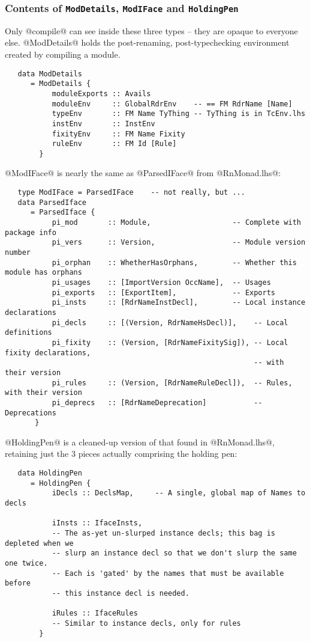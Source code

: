 \documentclass[11pt]{article}
\begin{document}
\subsubsection{Contents of \mbox{\tt ModDetails}, 
               \mbox{\tt ModIFace} and \mbox{\tt HoldingPen}}
Only @compile@ can see inside these three types -- they are opaque to
everyone else.  @ModDetails@ holds the post-renaming,
post-typechecking environment created by compiling a module.

\begin{verbatim}
   data ModDetails
      = ModDetails {
           moduleExports :: Avails
           moduleEnv     :: GlobalRdrEnv    -- == FM RdrName [Name]
           typeEnv       :: FM Name TyThing -- TyThing is in TcEnv.lhs
           instEnv       :: InstEnv
           fixityEnv     :: FM Name Fixity
           ruleEnv       :: FM Id [Rule]
        }
\end{verbatim}

@ModIFace@ is nearly the same as @ParsedIFace@ from @RnMonad.lhs@:
\begin{verbatim}
   type ModIFace = ParsedIFace    -- not really, but ...
   data ParsedIface
      = ParsedIface {
           pi_mod       :: Module,                   -- Complete with package info
           pi_vers      :: Version,                  -- Module version number
           pi_orphan    :: WhetherHasOrphans,        -- Whether this module has orphans
           pi_usages    :: [ImportVersion OccName],  -- Usages
           pi_exports   :: [ExportItem],             -- Exports
           pi_insts     :: [RdrNameInstDecl],        -- Local instance declarations
           pi_decls     :: [(Version, RdrNameHsDecl)],    -- Local definitions
           pi_fixity    :: (Version, [RdrNameFixitySig]), -- Local fixity declarations, 
                                                          -- with their version
           pi_rules     :: (Version, [RdrNameRuleDecl]),  -- Rules, with their version
           pi_deprecs   :: [RdrNameDeprecation]           -- Deprecations
       }
\end{verbatim}

@HoldingPen@ is a cleaned-up version of that found in @RnMonad.lhs@, 
retaining just the 3 pieces actually comprising the holding pen:
\begin{verbatim}
   data HoldingPen 
      = HoldingPen {
           iDecls :: DeclsMap,     -- A single, global map of Names to decls

           iInsts :: IfaceInsts,
           -- The as-yet un-slurped instance decls; this bag is depleted when we
           -- slurp an instance decl so that we don't slurp the same one twice.
           -- Each is 'gated' by the names that must be available before
           -- this instance decl is needed.

           iRules :: IfaceRules
           -- Similar to instance decls, only for rules
        }
\end{verbatim}
\end{document}
